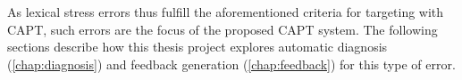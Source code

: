 	As lexical stress errors thus fulfill the aforementioned criteria for targeting with CAPT, such errors are the focus of the proposed CAPT system. The following sections describe how this thesis project explores automatic diagnosis (\cref{chap:diagnosis}) and feedback generation (\cref{chap:feedback}) for this type of error.		
		

	

